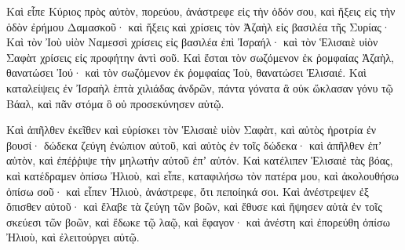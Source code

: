 {Καὶ εἶπε Κύριος πρὸς αὐτὸν, πορεύου, ἀνάστρεφε εἰς τὴν ὁδόν σου, καὶ ἥξεις εἰς τὴν ὁδὸν ἐρήμου Δαμασκοῦ· καὶ ἥξεις καὶ χρίσεις τὸν Ἀζαὴλ εἰς βασιλέα τῆς Συρίας·
Καὶ τὸν Ἰοὺ υἱὸν Ναμεσσὶ χρίσεις εἰς βασιλέα ἐπὶ Ἰσραήλ· καὶ τὸν Ἑλισαιὲ υἱὸν Σαφὰτ χρίσεις εἰς προφήτην ἀντὶ σοῦ.
Καὶ ἔσται τὸν σωζόμενον ἐκ ῥομφαίας Ἀζαὴλ, θανατώσει Ἰού· καὶ τὸν σωζόμενον ἐκ ῥομφαίας Ἰοὺ, θανατώσει Ἑλισαιέ.
Καὶ καταλείψεις ἐν Ἰσραὴλ ἑπτὰ χιλιάδας ἀνδρῶν, πάντα γόνατα ἃ οὐκ ὤκλασαν γόνυ τῷ Βάαλ, καὶ πᾶν στόμα ὃ οὐ προσεκύνησεν αὐτῷ.
\par }{\PP {}Καὶ ἀπῆλθεν ἐκεῖθεν καὶ εὑρίσκει τὸν Ἑλισαιὲ υἱὸν Σαφὰτ, καὶ αὐτὸς ἠροτρία ἐν βουσί· δώδεκα ζεύγη ἐνώπιον αὐτοῦ, καὶ αὐτὸς ἐν τοῖς δώδεκα· καὶ ἀπῆλθεν ἐπʼ αὐτὸν, καὶ ἐπέῤῥιψε τὴν μηλωτὴν αὐτοῦ ἐπʼ αὐτόν.
Καὶ κατέλιπεν Ἑλισαιὲ τὰς βόας, καὶ κατέδραμεν ὀπίσω Ἠλιοὺ, καὶ εἶπε, καταφιλήσω τὸν πατέρα μου, καὶ ἀκολουθήσω ὀπίσω σοῦ· καὶ εἶπεν Ἠλιοὺ, ἀνάστρεφε, ὅτι πεποίηκά σοι.
Καὶ ἀνέστρεψεν ἐξ ὄπισθεν αὐτοῦ· καὶ ἔλαβε τὰ ζεύγη τῶν βοῶν, καὶ ἔθυσε καὶ ἥψησεν αὐτὰ ἐν τοῖς σκεύεσι τῶν βοῶν, καὶ ἔδωκε τῷ λαῷ, καὶ ἔφαγον· καὶ ἀνέστη καὶ ἐπορεύθη ὀπίσω Ἠλιοὺ, καὶ ἐλειτούργει αὐτῷ.

}
